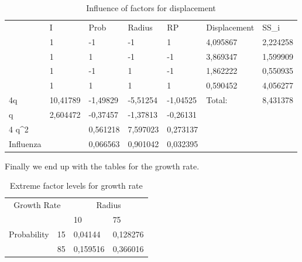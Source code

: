 \begin{table}[H] \label{tab:Displacement}
\centering
\begin{tabular}{l|l|l|l|l|ll}
\cline{2-7}
 & I & Prob & Radius & RP & \multicolumn{1}{l|}{Displacement} & \multicolumn{1}{l|}{SS\_i} \\ \cline{2-7} 
 & 1 & -1 & -1 & 1 & \multicolumn{1}{l|}{4,095867} & \multicolumn{1}{l|}{2,224258} \\ \cline{2-7} 
 & 1 & 1 & -1 & -1 & \multicolumn{1}{l|}{3,869347} & \multicolumn{1}{l|}{1,599909} \\ \cline{2-7} 
 & 1 & -1 & 1 & -1 & \multicolumn{1}{l|}{1,862222} & \multicolumn{1}{l|}{0,550935} \\ \cline{2-7} 
 & 1 & 1 & 1 & 1 & \multicolumn{1}{l|}{0,590452} & \multicolumn{1}{l|}{4,056277} \\ \hline \multicolumn{1}{|l|}{4q} & 10,41789 & -1,49829 & -5,51254 & -1,04525 & \multicolumn{1}{l|}{Total:} & \multicolumn{1}{l|}{8,431378} \\ \hline
\multicolumn{1}{|l|}{q} & 2,604472 & -0,37457 & -1,37813 & -0,26131 &  &  \\ \cline{1-5}
\multicolumn{1}{|l|}{4 q\textasciicircum{}2} &  & 0,561218 & 7,597023 & 0,273137 &  &  \\ \cline{1-5}
\multicolumn{1}{|l|}{Influenza} &  & 0,066563 & 0,901042 & 0,032395 &  &  \\ \cline{1-5}
\end{tabular}
\caption{Influence of factors for displacement}
\end{table}

Finally we end up with the tables for the growth rate.

\begin{table}[H]
\centering
\begin{tabular}{|cl|ll|}
\hline
\multicolumn{2}{|c|}{\multirow{2}{*}{Growth Rate}} & \multicolumn{2}{c|}{Radius} \\ \cline{3-4} 
\multicolumn{2}{|c|}{} & \multicolumn{1}{l|}{10} & 75 \\ \hline
\multicolumn{1}{|c|}{\multirow{2}{*}{Probability}} & 15 & \multicolumn{1}{l|}{0,04144} & 0,128276 \\ \cline{2-4} 
\multicolumn{1}{|c|}{} & 85 & \multicolumn{1}{l|}{0,159516} & 0,366016 \\ \hline
\end{tabular}
\caption{Extreme factor levels for growth rate}
\end{table}

